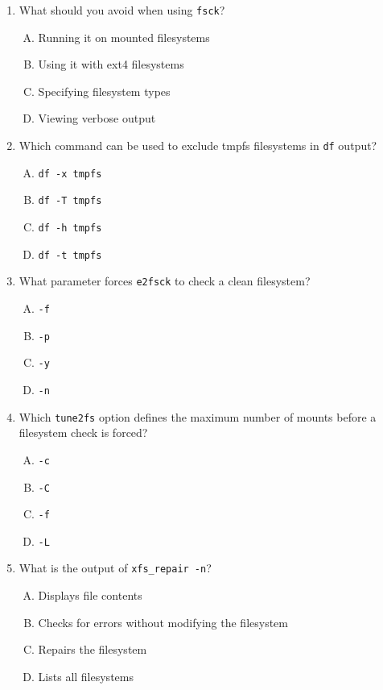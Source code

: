 \documentclass[a4paper]{report}
\begin{document}
\begin{enumerate}[1.]
    \item What should you avoid when using \texttt{fsck}?  
    \begin{enumerate}[A)]
        \item Running it on mounted filesystems  
        \item Using it with ext4 filesystems  
        \item Specifying filesystem types  
        \item Viewing verbose output  
    \end{enumerate}

    \item Which command can be used to exclude tmpfs filesystems in \texttt{df} output?  
    \begin{enumerate}[A)]
        \item \texttt{df -x tmpfs}  
        \item \texttt{df -T tmpfs}  
        \item \texttt{df -h tmpfs}  
        \item \texttt{df -t tmpfs}  
    \end{enumerate}

    \item What parameter forces \texttt{e2fsck} to check a clean filesystem?  
    \begin{enumerate}[A)]
        \item \texttt{-f}  
        \item \texttt{-p}  
        \item \texttt{-y}  
        \item \texttt{-n}  
    \end{enumerate}

    \item Which \texttt{tune2fs} option defines the maximum number of mounts before a filesystem check is forced?  
    \begin{enumerate}[A)]
        \item \texttt{-c}  
        \item \texttt{-C}  
        \item \texttt{-f}  
        \item \texttt{-L}  
    \end{enumerate}

    \item What is the output of \texttt{xfs\_repair -n}?  
    \begin{enumerate}[A)]
        \item Displays file contents  
        \item Checks for errors without modifying the filesystem  
        \item Repairs the filesystem  
        \item Lists all filesystems  
    \end{enumerate}


\end{enumerate}
\end{document}
